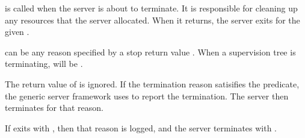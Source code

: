  is called when the server is about to terminate. It
is responsible for cleaning up any resources that the server
allocated. When it returns, the server exits for the given
.

 can be any reason specified by a stop return value
. When a supervision tree is terminating,
 will be .

The return value of  is ignored.  If the
termination reason satisifies the 
predicate, the
generic server framework uses  to report the
termination. The server then terminates for that reason.

If  exits with , then that reason is
logged, and the server terminates with .
